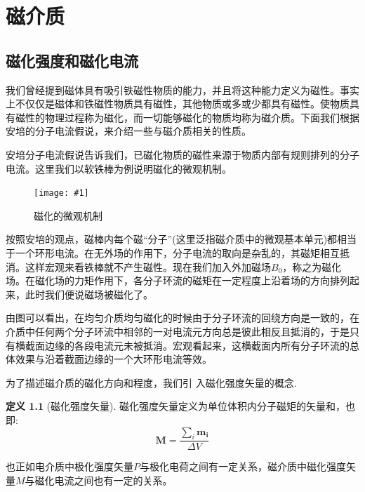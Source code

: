 \documentclass[12pt,a4paper,oneside]{report}
\theoremstyle{definition}
\newtheorem{definition}{定义}[chapter]
\theoremstyle{remark}
\newcommand{\insertfig}[3]{
    \begin{figure}[ht]
        \centering
        \texttt{[image: \#1]}
        \caption{#2}
        \label{fig:#1}
    \end{figure}
}
\begin{document}
\clearpage

\chapter{磁介质}
\section{磁化强度和磁化电流}
我们曾经提到磁体具有吸引铁磁性物质的能力，并且将这种能力定义为磁性。事实上不仅仅是磁体和铁磁性物质具有磁性，其他物质或多或少都具有磁性。使物质具有磁性的物理过程称为磁化，而一切能够磁化的物质均称为磁介质。下面我们根据安培的分子电流假说，来介绍一些与磁介质相关的性质。

安培分子电流假说告诉我们，已磁化物质的磁性来源于物质内部有规则排列的分子电流。这里我们以软铁棒为例说明磁化的微观机制。
\insertfig{3-1.png}{磁化的微观机制}{0.25}

按照安培的观点，磁棒内每个磁``分子''(这里泛指磁介质中的微观基本单元)都相当于一个环形电流。在无外场的作用下，分子电流的取向是杂乱的，其磁矩相互抵消。这样宏观来看铁棒就不产生磁性。现在我们加入外加磁场$B_0$，称之为磁化场。在磁化场的力矩作用下，各分子环流的磁矩在一定程度上沿着场的方向排列起来，此时我们便说磁场被磁化了。

由图可以看出，在均匀介质均匀磁化的时候由于分子环流的回绕方向是一致的，在介质中任何两个分子环流中相邻的一对电流元方向总是彼此相反且抵消的，于是只有横截面边缘的各段电流元未被抵消。宏观看起来，这横截面内所有分子环流的总体效果与沿着截面边缘的一个大环形电流等效。

为了描述磁介质的磁化方向和程度，我们引
入磁化强度矢量的概念.
\begin{definition}[磁化强度矢量]
磁化强度矢量定义为单位体积内分子磁矩的矢量和，也即:
\[
\mathbf{M} = \frac{\sum_i \mathbf{m_i}}{\Delta V}
\]
\end{definition}

也正如电介质中极化强度矢量$P$与极化电荷之间有一定关系，磁介质中磁化强度矢量$M$与磁化电流之间也有一定的关系。
\end{document}
